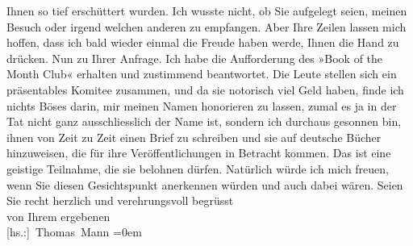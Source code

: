 \begin{ledgroupsized}[t]{13cm}
               Ihnen so tief erschüttert wurden. Ich wusste nicht, ob Sie aufgelegt seien, meinen
               Besuch oder irgend welchen anderen zu empfangen. Aber Ihre Zeilen lassen mich hoffen,
               dass ich bald wieder einmal die Freude haben werde, Ihnen die Hand zu drücken.\pend
           \pstart
           Nun zu Ihrer Anfrage. Ich habe die Aufforderung des »Book of the Month Club« erhalten und zustimmend beantwortet. Die Leute
               stellen sich ein präsentables Komitee zusammen, und da sie notorisch viel Geld haben,
               finde ich nichts Böses darin, mir meinen Namen honorieren zu lassen, zumal es ja in
               der Tat nicht ganz ausschliesslich der Name ist, sondern ich durchaus gesonnen bin,
               ihnen von Zeit zu Zeit einen Brief zu schreiben und sie auf deutsche Bücher
               hinzuweisen, die für ihre Veröffentlichungen in Betracht kommen. Das ist eine
               geistige Teilnahme, die sie belohnen {\pb}dürfen. Natürlich würde ich mich freuen, wenn Sie diesen Gesichtspunkt anerkennen
               würden und auch dabei wären.\pend
           \pstart
           Seien Sie recht herzlich und verehrungsvoll begrüsst{\\[\baselineskip]} von Ihrem ergebenen{\\[\baselineskip]}\spacefill\mbox{{[}hs.:{]} Thomas Mann}\pend
           \leftskip=0em{}
         
         \endnumbering{}\end{ledgroupsized}  \newcommand{\dateiname}{L02508}\newcommand{\titel}{Thomas Mann an Arthur Schnitzler, 1. 2. 1929}\newcommand{\editorInnen}{Martin Anton Müller und Gerd-Hermann Susen}
      